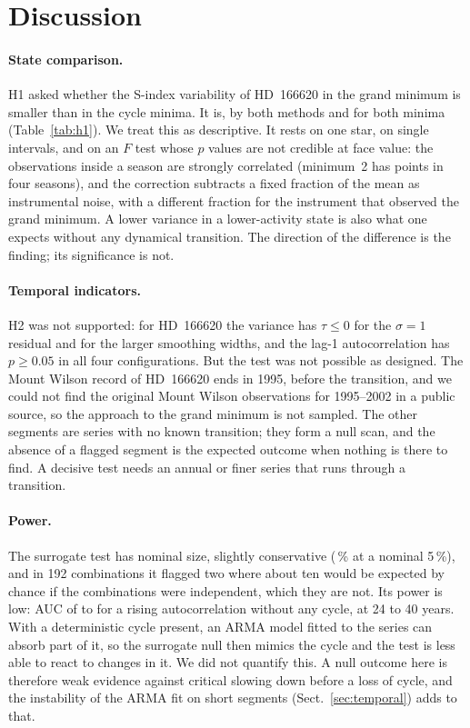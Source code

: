 \section{Discussion}
\label{sec:disc}

\paragraph{State comparison.} H1 asked whether the S-index variability of HD~166620 in the grand minimum is smaller than in the cycle minima. It is, by both methods and for both minima (Table~\ref{tab:h1}). We treat this as descriptive. It rests on one star, on single intervals, and on an $F$ test whose $p$ values are not credible at face value: the observations inside a season are strongly correlated (minimum~2 has \HOneNMinTwo{} points in four seasons), and the correction subtracts a fixed fraction of the mean as instrumental noise, with a different fraction for the instrument that observed the grand minimum. A lower variance in a lower-activity state is also what one expects without any dynamical transition. The direction of the difference is the finding; its significance is not.

\paragraph{Temporal indicators.} H2 was not supported: for HD~166620 the variance has $\tau \le 0$ for the $\sigma = 1$ residual and for the larger smoothing widths, and the lag-1 autocorrelation has $p \ge 0.05$ in all four configurations. But the test was not possible as designed. The Mount Wilson record of HD~166620 ends in 1995, before the transition, and we could not find the original Mount Wilson observations for 1995--2002 in a public source, so the approach to the grand minimum is not sampled. The other \NSegments{} segments are series with no known transition; they form a null scan, and the absence of a flagged segment is the expected outcome when nothing is there to find. A decisive test needs an annual or finer series that runs through a transition.

\paragraph{Power.} The surrogate test has nominal size, slightly conservative (\AutoUp\,\% at a nominal 5\,\%), and in 192 combinations it flagged two where about ten would be expected by chance if the combinations were independent, which they are not. Its power is low: AUC of \AUCTwentyFour{} to \AUCForty{} for a rising autocorrelation without any cycle, at 24 to 40 years. With a deterministic cycle present, an ARMA model fitted to the series can absorb part of it, so the surrogate null then mimics the cycle and the test is less able to react to changes in it. We did not quantify this. A null outcome here is therefore weak evidence against critical slowing down before a loss of cycle, and the instability of the ARMA fit on short segments (Sect.~\ref{sec:temporal}) adds to that.

